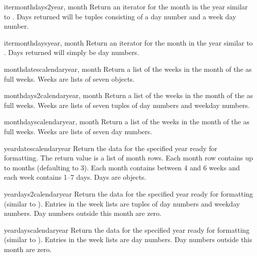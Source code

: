 \begin{methoddesc}{itermonthdays2}{year, month}
Return an iterator for the month  in the year
 similar to . Days returned
will be tuples consisting of a day number and a week day
number.
\end{methoddesc}

\begin{methoddesc}{itermonthdays}{year, month}
Return an iterator for the month  in the year
 similar to . Days returned
will simply be day numbers.
\end{methoddesc}

\begin{methoddesc}{monthdatescalendar}{year, month}
Return a list of the weeks in the month  of
the  as full weeks. Weeks are lists of seven
 objects.
\end{methoddesc}

\begin{methoddesc}{monthdays2calendar}{year, month}
Return a list of the weeks in the month  of
the  as full weeks. Weeks are lists of seven
tuples of day numbers and weekday numbers.
\end{methoddesc}

\begin{methoddesc}{monthdayscalendar}{year, month}
Return a list of the weeks in the month  of
the  as full weeks. Weeks are lists of seven
day numbers.
\end{methoddesc}

\begin{methoddesc}{yeardatescalendar}{year}
Return the data for the specified year ready for formatting. The return
value is a list of month rows. Each month row contains up to 
months (defaulting to 3). Each month contains between 4 and 6 weeks and
each week contains 1--7 days. Days are  objects.
\end{methoddesc}

\begin{methoddesc}{yeardays2calendar}{year}
Return the data for the specified year ready for formatting (similar to
). Entries in the week lists are tuples of
day numbers and weekday numbers. Day numbers outside this month are zero.
\end{methoddesc}

\begin{methoddesc}{yeardayscalendar}{year}
Return the data for the specified year ready for formatting (similar to
). Entries in the week lists are day numbers.
Day numbers outside this month are zero.
\end{methoddesc}


